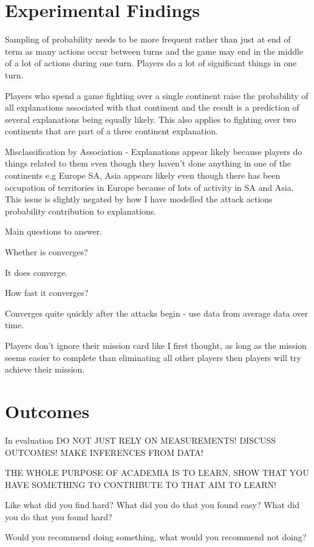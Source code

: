 \documentclass[parskip]{cs4rep}
\begin{document}
\section{Experimental Findings}

Sampling of probability needs to be more frequent rather than just at end of term as many actions occur between turns and the game may end in the middle of a lot of actions during one turn. Players do a lot of significant things in one turn.

Players who spend a game fighting over a single continent raise the probability of all explanations associated with that continent and the result is a prediction of several explanations being equally likely. This also applies to fighting over two continents that are part of a three continent explanation.

Misclassification by Association - Explanations appear likely because players do things related to them even though they haven't done anything in one of the continents e.g Europe SA, Asia appears likely even though there has been occupation of territories in Europe because of lots of activity in SA and Asia. This issue is slightly negated by how I have modelled the attack actions probability contribution to explanations.

Main questions to answer.

Whether is converges?

It does converge.

How fast it converges?

Converges quite quickly after the attacks begin - use data from average data over time.

Players don't ignore their mission card like I first thought, as long as the mission seems easier to complete than eliminating all other players then players will try achieve their mission.

\section{Outcomes}

In evaluation DO NOT JUST RELY ON MEASUREMENTS! DISCUSS OUTCOMES! MAKE INFERENCES FROM DATA!

THE WHOLE PURPOSE OF ACADEMIA IS TO LEARN, SHOW THAT YOU HAVE SOMETHING TO CONTRIBUTE TO THAT AIM TO LEARN!

Like what did you find hard? What did you do that you found easy? What did you do that you found hard? 

Would you recommend doing something, what would you recommend not doing?
\end{document}
